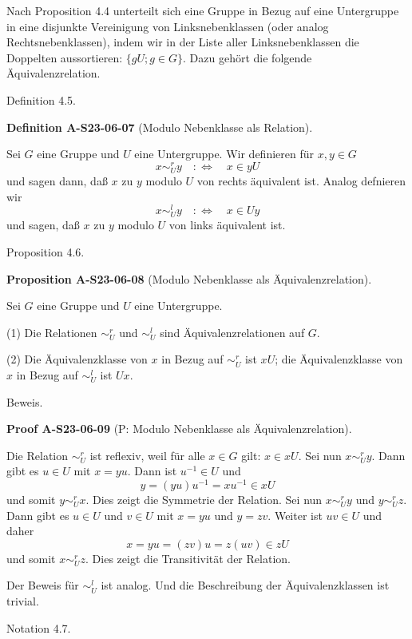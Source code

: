 \documentclass[10pt, letterpaper]{article}
\newcommand{\CustomHeading}[3]{%
  \par\medskip\noindent%
  \textbf{#1 #2} \textnormal{(#3)}.\enskip%
}
\newenvironment{DEF}[2]{\begin{unitbox}\CustomHeading{Definition}{#1}{#2}}{\end{unitbox}}
\newenvironment{PROP}[2]{\begin{unitbox}\CustomHeading{Proposition}{#1}{#2}}{\end{unitbox}}
\newenvironment{PROOF}[2]{\begin{unitbox}\CustomHeading{Proof}{#1}{#2}}{\end{unitbox}}
\begin{document}
Nach Proposition 4.4 unterteilt sich eine Gruppe in Bezug auf eine Untergruppe in eine disjunkte Vereinigung von Linksnebenklassen (oder analog Rechtsnebenklassen), indem wir in der Liste aller Linksnebenklassen die Doppelten aussortieren: $\{g U ; g \in G\}$. Dazu gehört die folgende Äquivalenzrelation.

Definition 4.5. 


\begin{DEF}{A-S23-06-07}{Modulo Nebenklasse als Relation}
Sei $G$ eine Gruppe und $U$ eine Untergruppe. Wir definieren für $x, y \in G$
$$
x \sim_{U}^{r} y \quad: \Longleftrightarrow \quad x \in y U
$$
und sagen dann, daß $x$ zu $y$ modulo $U$ von rechts äquivalent ist. Analog defnieren wir
$$
x \sim_{U}^{l} y \quad: \Longleftrightarrow \quad x \in U y
$$
und sagen, daß $x$ zu $y$ modulo $U$ von links äquivalent ist.
\end{DEF}


Proposition 4.6. 


\begin{PROP}{A-S23-06-08}{Modulo Nebenklasse als Äquivalenzrelation}
Sei $G$ eine Gruppe und $U$ eine Untergruppe.

(1) Die Relationen $\sim_{U}^{r}$ und $\sim_{U}^{l}$ sind Äquivalenzrelationen auf $G$.

(2) Die Äquivalenzklasse von $x$ in Bezug auf $\sim_{U}^{r}$ ist $x U$; die Äquivalenzklasse von $x$ in Bezug auf $\sim_{U}^{l}$ ist $U x$.
\end{PROP}


Beweis. 

\begin{PROOF}{A-S23-06-09}{P: Modulo Nebenklasse als Äquivalenzrelation}
Die Relation $\sim_{U}^{r}$ ist reflexiv, weil für alle $x \in G$ gilt: $x \in x U$. Sei nun $x \sim_{U}^{r} y$. Dann gibt es $u \in U$ mit $x=y u$. Dann ist $u^{-1} \in U$ und
$$
y=(y u) u^{-1}=x u^{-1} \in x U
$$
und somit $y \sim_{U}^{r} x$. Dies zeigt die Symmetrie der Relation. Sei nun $x \sim_{U}^{r} y$ und $y \sim_{U}^{r} z$. Dann gibt es $u \in U$ und $v \in U$ mit $x=y u$ und $y=z v$. Weiter ist $u v \in U$ und daher
$$
x=y u=(z v) u=z(u v) \in z U
$$
und somit $x \sim_{U}^{r} z$. Dies zeigt die Transitivität der Relation.


Der Beweis für $\sim_{U}^{l}$ ist analog. Und die Beschreibung der Äquivalenzklassen ist trivial.
\end{PROOF}



Notation 4.7. 
\end{document}
